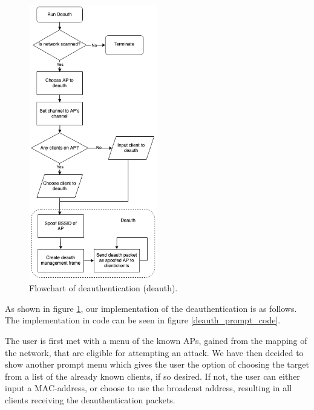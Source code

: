 \begin{figure}[!htbp]
  \centering
   \includegraphics[width=0.5\textwidth]{Latex-Files/Billeder/Flowcharts/deauth_flowchart.png}
   \caption{Flowchart of deauthentication (deauth).}
   \label{flowchart_deauth}
\end{figure}

As shown in figure \ref{flowchart_deauth}, our implementation of the deauthentication is as follows. The implementation in code can be seen in figure \ref{deauth_prompt_code}.

The user is first met with a menu of the known APs, gained from the mapping of the network, that are eligible for attempting an attack.
We have then decided to show another prompt menu which gives the user the option of choosing the target from a list of the already known clients, if so desired. If not, the user can either input a MAC-address, or choose to use the broadcast address, resulting in all clients receiving the deauthentication packets. 


